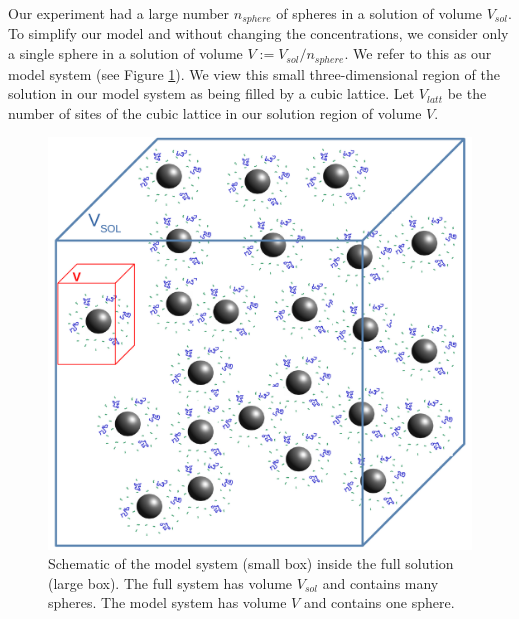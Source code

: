 \documentclass[journal=mamobx,manuscript=article]{achemso}
\begin{document}
Our experiment had a large number $n_{sphere}$ of spheres in a solution of volume $V_{sol}$.  
To simplify 
our model and without changing the concentrations, we consider only a single sphere in a solution
of volume $V:=V_{sol}/n_{sphere}$.  We refer to this as our model system (see Figure \ref{figure1volume}).
We view this small three-dimensional region of the solution in our model system as being filled by a 
cubic lattice.
Let $V_{latt}$ be the number of sites of the cubic 
lattice in our solution region of volume $V$.




 \begin{figure}[H] 
  \includegraphics[scale=0.5]{fig7a_apr28_2020.pdf}
\caption{Schematic of the model system (small box)
inside the full solution (large box). The full system
has volume $V_{sol}$ and contains many spheres.  The model
system has volume $V$ and contains one sphere.}
\label{figure1volume}
\end{figure}


\end{document}

